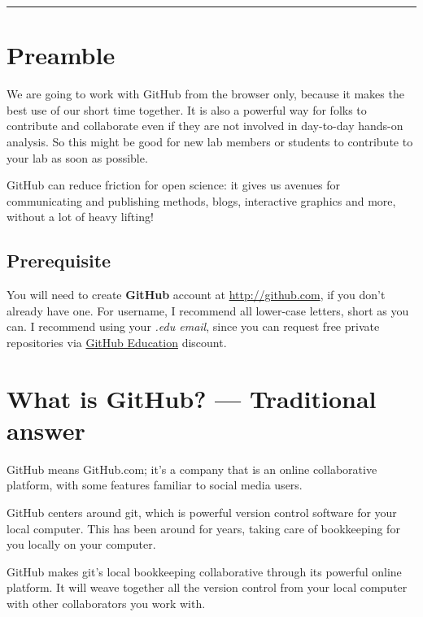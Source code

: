 \documentclass[
  letterpaper,
  DIV=11,
  numbers=noendperiod]{scrreprt}
\begin{document}
\begin{center}\rule{0.5\linewidth}{0.5pt}\end{center}

\hypertarget{preamble}{%
\section{Preamble}\label{preamble}}

We are going to work with GitHub from the browser only, because it makes
the best use of our short time together. It is also a powerful way for
folks to contribute and collaborate even if they are not involved in
day-to-day hands-on analysis. So this might be good for new lab members
or students to contribute to your lab as soon as possible.

GitHub can reduce friction for open science: it gives us avenues for
communicating and publishing methods, blogs, interactive graphics and
more, without a lot of heavy lifting!

\hypertarget{prerequisite}{%
\subsection{Prerequisite}\label{prerequisite}}

You will need to create \textbf{GitHub} account at
\url{http://github.com}, if you don't already have one. For username, I
recommend all lower-case letters, short as you can. I recommend using
your \emph{.edu email}, since you can request free private repositories
via \href{https://education.github.com/}{GitHub Education} discount.

\hypertarget{what-is-github-traditional-answer}{%
\section{What is GitHub? --- Traditional
answer}\label{what-is-github-traditional-answer}}

GitHub means GitHub.com; it's a company that is an online collaborative
platform, with some features familiar to social media users.

GitHub centers around git, which is powerful version control software
for your local computer. This has been around for years, taking care of
bookkeeping for you locally on your computer.

GitHub makes git's local bookkeeping collaborative through its powerful
online platform. It will weave together all the version control from
your local computer with other collaborators you work with.
\end{document}
